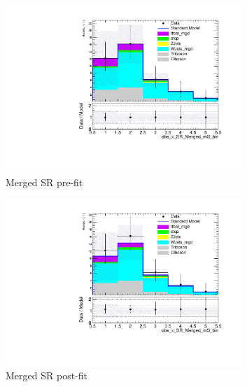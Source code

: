 \begin{figure}[h]
  \centering

     \begin{subfigure}{0.49\textwidth}
     \includegraphics[width = 0.98\textwidth]{Figures/5/bkg_only/SR_Merged_mS_bin_beforeFit.pdf}
     \caption{Merged SR pre-fit}
     \end{subfigure}
     \begin{subfigure}{0.49\textwidth}
     \includegraphics[width = 0.98\textwidth]{Figures/5/bkg_only/SR_Merged_mS_bin_afterFit.pdf}
     \caption{Merged SR post-fit}
     \end{subfigure}
     \begin{subfigure}{0.49\textwidth}

\end{subfigure}
\end{figure}
